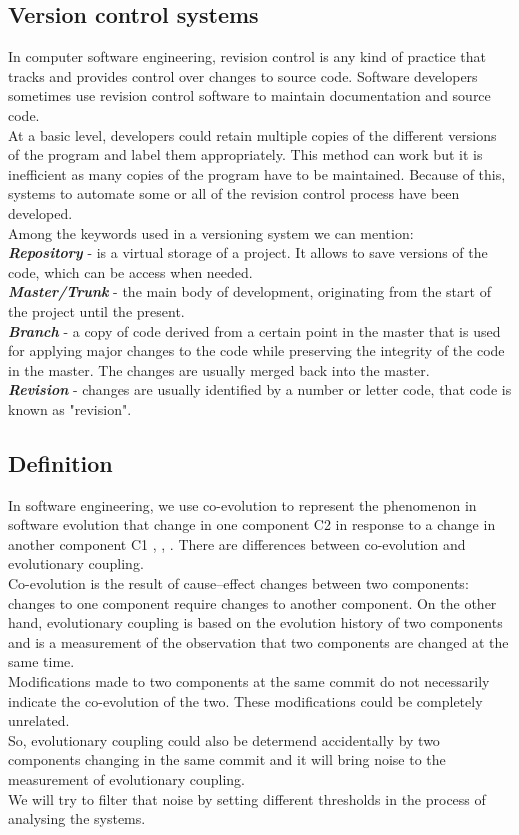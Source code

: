 \subsection{Version control systems}
In computer software engineering, revision control is any kind of practice that tracks and provides control over changes to source code. Software developers sometimes use revision control software to maintain documentation and source code.\\
At a basic level, developers could retain multiple copies of the different versions of the program and label them appropriately. This method can work but it is inefficient as many copies of the program have to be maintained. Because of this, systems to automate some or all of the revision control process have been developed. 
\\ 
\tab Among the keywords used in a versioning system we can mention:\\
\textit{\textbf{Repository}} -  is a virtual storage of a project. It allows to save versions of the code, which can be access when needed.\\
\textit{\textbf{Master/Trunk}} - the main body of development, originating from the start of the project until the present.\\
\textit{\textbf{Branch} }- a copy of code derived from a certain point in the master that is used for applying major changes to the code while preserving the integrity of the code in the master. The changes are usually merged back into the master.\\
\textit{\textbf{Revision}} - changes are usually identified by a number or letter code, that code is known as "revision".\\


\subsection{Definition}

\tab  In software engineering, we use co-evolution to represent the phenomenon in software evolution that change in one component C2 in response to a change in another component C1 \cite{ct5}, \cite{ct6}, \cite{ct8}. 
There are differences between co-evolution and evolutionary coupling.\\
\tab Co-evolution is the result of cause–effect changes between two components: changes to one component require changes to another component. On the other hand, evolutionary coupling is based on the evolution history of two components and is a measurement of the observation that two components are changed at the same time.\\ 
\tab  Modifications made to two components at the same commit do not necessarily indicate the co-evolution of the two. These modiﬁcations could be completely unrelated.\\ So, evolutionary coupling could also be determend accidentally by two components changing in the same commit and it will bring noise to the measurement of evolutionary coupling.  \cite{ct5} \\ We will try to filter that noise by setting different thresholds in the process of analysing the systems.

